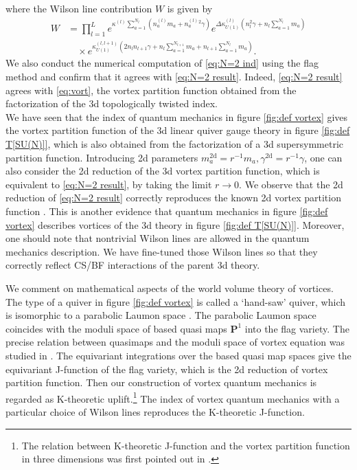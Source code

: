 \documentclass[a4paper,11pt]{article}
\begin{document}
where the Wilson line contribution $W$ is given by
\begin{align}
%
W &= \prod_{l = 1}^L e^{\kappa^{(l)} \sum_{a = 1}^{N_l} (n^{(l)}_a m_a+n^{(l)}_a{}^2 \gamma)} e^{\Delta \kappa_{U(1)}^{(l)} (n_l^2 \gamma+n_l \sum_{a = 1}^{N_l} m_a)} \nonumber \\
%
&\quad \times e^{\kappa_{U(1)}^{(l,l+1)} (2 n_l n_{l+1} \gamma+n_l \sum_{a = 1}^{N_{l+1}} m_a+n_{l+1} \sum_{a = 1}^{N_l} m_a)}.
%
\end{align}
We also conduct the numerical computation of \eqref{eq:N=2 ind} using the flag method \cite{Benini:2013xpa} and confirm that it agrees with \eqref{eq:N=2 result}. Indeed, \eqref{eq:N=2 result} agrees with \eqref{eq:vort}, the vortex partition function obtained from the factorization of the 3d topologically twisted index.
\\


We have seen that the index of quantum mechanics in figure \ref{fig:def vortex} gives the vortex partition function of the 3d linear quiver gauge theory in figure \ref{fig:def T[SU(N)]}, which is also obtained from the factorization of a 3d supersymmetric partition function. Introducing 2d parameters $m^\text{2d}_a =  r^{-1} m_a, \gamma^\text{2d} = r^{-1} \gamma$, one can also consider the 2d reduction of the 3d vortex partition function, which is equivalent to \eqref{eq:N=2 result}, by taking the limit $r \rightarrow 0$. We observe that the 2d reduction of \eqref{eq:N=2 result} correctly reproduces the known 2d vortex partition function \cite{Nawata:2014nca}. This is another evidence that quantum mechanics in figure \ref{fig:def vortex} describes vortices of the 3d theory in figure \ref{fig:def T[SU(N)]}. Moreover, one should note that nontrivial Wilson lines are allowed in the quantum mechanics description. We have fine-tuned those Wilson lines so that they correctly reflect CS/BF interactions of the parent 3d theory.

We comment on mathematical aspects of the world volume theory of vortices. The type of a quiver in figure \ref{fig:def vortex} is called a `hand-saw' quiver, which is isomorphic
to a parabolic Laumon space \cite{Finkelberg2014}. The parabolic Laumon space  coincides with  the moduli space of based quasi maps $\mathbf P^1$ into the flag variety.
The precise relation between quasimaps and the moduli space of vortex equation was studied in \cite{Venugopalan2013}.
The equivariant integrations over the based quasi map spaces give the equivariant J-function of the flag variety, which is the 2d reduction of  vortex partition function. Then
 our construction of vortex quantum mechanics is regarded as K-theoretic uplift.\footnote{The relation between K-theoretic J-function \cite{Givental2003} and the vortex partition function in three dimensions  was first pointed out in \cite{Dimofte:2010tz}.}  The index of vortex quantum mechanics with a particular choice of Wilson lines  reproduces the K-theoretic J-function.
\\
\end{document}

